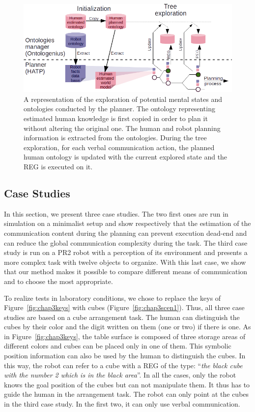 \documentclass[a4paper,11pt,twoside]{StyleThese}
\begin{document}
\begin{figure}[t!]
\centering
\includegraphics[width=\textwidth]{figures/chapter3/struct.png}
\caption{\label{fig:integration} A representation of the exploration of potential mental states and ontologies conducted by the planner. The ontology representing estimated human knowledge is first copied in order to plan it without altering the original one. The human and robot planning information is extracted from the ontologies. During the tree exploration, for each verbal communication action, the planned human ontology is updated with the current explored state and the REG is executed on it.}
\end{figure}

\subsection{Case Studies}
\label{sec:Case_studies}

In this section, we present three case studies. The two first ones are run in simulation on a minimalist setup and show respectively that the estimation of the communication content during the planning can prevent execution dead-end and can reduce the global communication complexity during the task. The third case study is run on a PR2 robot with a perception of its environment and presents a more complex task with twelve objects to organize. With this last case, we show that our method makes it possible to compare different means of communication and to choose the most appropriate.

To realize tests in laboratory conditions, we chose to replace the keys of Figure~\ref{fig:chap3keys} with cubes (Figure~\ref{fig:chap3scen1}). Thus, all three case studies are based on a cube arrangement task. The human can distinguish the cubes by their color and the digit written on them (one or two) if there is one. As in Figure~\ref{fig:chap3keys}, the table surface is composed of three storage areas of different colors and cubes can be placed only in one of them. This symbolic position information can also be used by the human to distinguish the cubes. In this way, the robot can refer to a cube with a REG of the type: ``\textit{the black cube with the number 2 which is in the black area}''. In all the cases, only the robot knows the goal position of the cubes but can not manipulate them. It thus has to guide the human in the arrangement task. The robot can only point at the cubes in the third case study. In the first two, it can only use verbal communication.
\end{document}
